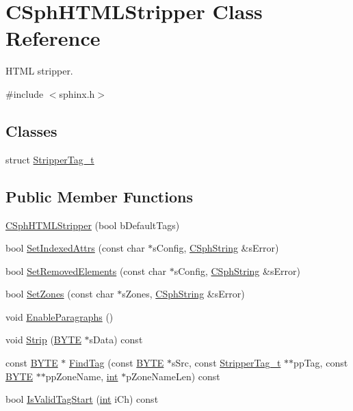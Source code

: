 \hypertarget{classCSphHTMLStripper}{\section{C\-Sph\-H\-T\-M\-L\-Stripper Class Reference}
\label{classCSphHTMLStripper}
}


H\-T\-M\-L stripper.  




{\ttfamily \#include $<$sphinx.\-h$>$}

\subsection*{Classes}
\begin{DoxyCompactItemize}
\item 
struct \hyperlink{structCSphHTMLStripper_1_1StripperTag__t}{Stripper\-Tag\-\_\-t}
\end{DoxyCompactItemize}
\subsection*{Public Member Functions}
\begin{DoxyCompactItemize}
\item 
\hyperlink{classCSphHTMLStripper_aeff08556dfba636d3feceffed62c1fda}{C\-Sph\-H\-T\-M\-L\-Stripper} (bool b\-Default\-Tags)
\item 
bool \hyperlink{classCSphHTMLStripper_a70bb7afa55d1ed77383b70da394c2284}{Set\-Indexed\-Attrs} (const char $\ast$s\-Config, \hyperlink{structCSphString}{C\-Sph\-String} \&s\-Error)
\item 
bool \hyperlink{classCSphHTMLStripper_a90a0e8e38534fa7af80914e3821c868c}{Set\-Removed\-Elements} (const char $\ast$s\-Config, \hyperlink{structCSphString}{C\-Sph\-String} \&s\-Error)
\item 
bool \hyperlink{classCSphHTMLStripper_abfd041410a93e042c134206340029e1e}{Set\-Zones} (const char $\ast$s\-Zones, \hyperlink{structCSphString}{C\-Sph\-String} \&s\-Error)
\item 
void \hyperlink{classCSphHTMLStripper_aa8a48477e9d9ff1b332421b23359771b}{Enable\-Paragraphs} ()
\item 
void \hyperlink{classCSphHTMLStripper_ace1b60171cecba7e171526a2a0c529bd}{Strip} (\hyperlink{sphinxstd_8h_a4ae1dab0fb4b072a66584546209e7d58}{B\-Y\-T\-E} $\ast$s\-Data) const 
\item 
const \hyperlink{sphinxstd_8h_a4ae1dab0fb4b072a66584546209e7d58}{B\-Y\-T\-E} $\ast$ \hyperlink{classCSphHTMLStripper_aa5770a5cb543b96f6a61e2f6b874ca3d}{Find\-Tag} (const \hyperlink{sphinxstd_8h_a4ae1dab0fb4b072a66584546209e7d58}{B\-Y\-T\-E} $\ast$s\-Src, const \hyperlink{structCSphHTMLStripper_1_1StripperTag__t}{Stripper\-Tag\-\_\-t} $\ast$$\ast$pp\-Tag, const \hyperlink{sphinxstd_8h_a4ae1dab0fb4b072a66584546209e7d58}{B\-Y\-T\-E} $\ast$$\ast$pp\-Zone\-Name, \hyperlink{sphinxexpr_8cpp_a4a26e8f9cb8b736e0c4cbf4d16de985e}{int} $\ast$p\-Zone\-Name\-Len) const 
\item 
bool \hyperlink{classCSphHTMLStripper_a8d90b329a2af2693d708c8038263fd47}{Is\-Valid\-Tag\-Start} (\hyperlink{sphinxexpr_8cpp_a4a26e8f9cb8b736e0c4cbf4d16de985e}{int} i\-Ch) const 
\end{DoxyCompactItemize}
